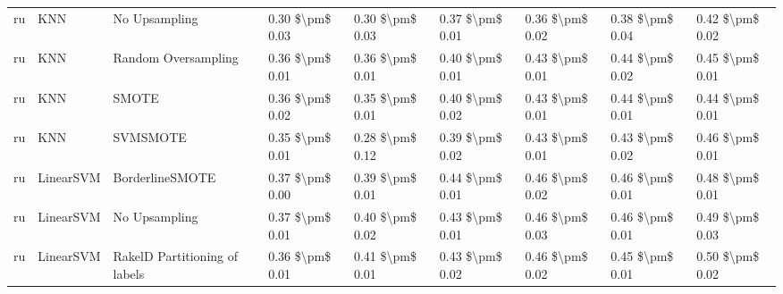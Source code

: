\begin{tabular}{lllllllll}
      ru &                             KNN &                 No Upsampling & 0.30 \$\textbackslash pm\$ 0.03 &           0.30 \$\textbackslash pm\$ 0.03 &       0.37 \$\textbackslash pm\$ 0.01 &        0.36 \$\textbackslash pm\$ 0.02 &                         0.38 \$\textbackslash pm\$ 0.04 &     0.42 \$\textbackslash pm\$ 0.02 \\
      ru &                             KNN &           Random Oversampling & 0.36 \$\textbackslash pm\$ 0.01 &           0.36 \$\textbackslash pm\$ 0.01 &       0.40 \$\textbackslash pm\$ 0.01 &        0.43 \$\textbackslash pm\$ 0.01 &                         0.44 \$\textbackslash pm\$ 0.02 &     0.45 \$\textbackslash pm\$ 0.01 \\
      ru &                             KNN &                         SMOTE & 0.36 \$\textbackslash pm\$ 0.02 &           0.35 \$\textbackslash pm\$ 0.01 &       0.40 \$\textbackslash pm\$ 0.02 &        0.43 \$\textbackslash pm\$ 0.01 &                         0.44 \$\textbackslash pm\$ 0.01 &     0.44 \$\textbackslash pm\$ 0.01 \\
      ru &                             KNN &                      SVMSMOTE & 0.35 \$\textbackslash pm\$ 0.01 &           0.28 \$\textbackslash pm\$ 0.12 &       0.39 \$\textbackslash pm\$ 0.02 &        0.43 \$\textbackslash pm\$ 0.01 &                         0.43 \$\textbackslash pm\$ 0.02 &     0.46 \$\textbackslash pm\$ 0.01 \\
      ru &                       LinearSVM &               BorderlineSMOTE & 0.37 \$\textbackslash pm\$ 0.00 &           0.39 \$\textbackslash pm\$ 0.01 &       0.44 \$\textbackslash pm\$ 0.01 &        0.46 \$\textbackslash pm\$ 0.02 &                         0.46 \$\textbackslash pm\$ 0.01 &     0.48 \$\textbackslash pm\$ 0.01 \\
      ru &                       LinearSVM &                 No Upsampling & 0.37 \$\textbackslash pm\$ 0.01 &           0.40 \$\textbackslash pm\$ 0.02 &       0.43 \$\textbackslash pm\$ 0.01 &        0.46 \$\textbackslash pm\$ 0.03 &                         0.46 \$\textbackslash pm\$ 0.01 &     0.49 \$\textbackslash pm\$ 0.03 \\
      ru &                       LinearSVM & RakelD Partitioning of labels & 0.36 \$\textbackslash pm\$ 0.01 &           0.41 \$\textbackslash pm\$ 0.01 &       0.43 \$\textbackslash pm\$ 0.02 &        0.46 \$\textbackslash pm\$ 0.02 &                         0.45 \$\textbackslash pm\$ 0.01 &     0.50 \$\textbackslash pm\$ 0.02 \\

\end{tabular}

